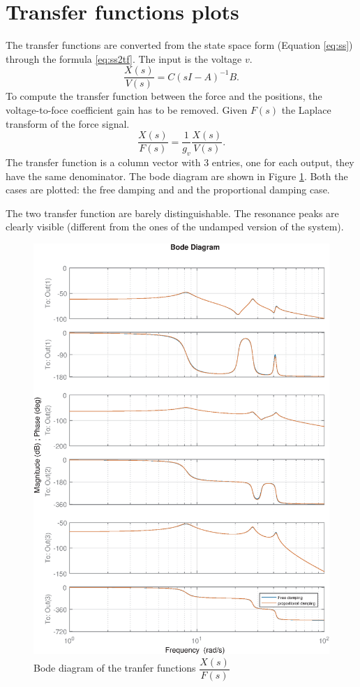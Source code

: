 \documentclass[twosided,a4paper]{article}           %
\begin{document}
\section{Transfer functions plots}
The transfer functions are converted from the state space form (Equation \eqref{eq:ss}) through the formula \eqref{eq:ss2tf}. The input is the voltage $v$.
\begin{equation}
\label{eq:ss2tf}
	\dfrac{X(s)}{V(s)} = C(sI-A)^{-1}B.
\end{equation}
To compute the transfer function between the force and the positions, the voltage-to-foce coefficient gain has to be removed. Given $F(s)$ the Laplace transform of the force signal.
\begin{equation}
	\dfrac{X(s)}{F(s)} = \dfrac{1}{g_v}\dfrac{X(s)}{V(s)}.
\end{equation}
The transfer function is a column vector with 3 entries, one for each output, they have the same denominator. The bode diagram are shown in Figure \ref{fig:bode_fp}. Both the cases are plotted: the free damping and and the proportional damping case. \\
\par \noindent
The two transfer function are barely distinguishable. The resonance peaks are clearly visible (different from the ones of the undamped version of the system).
\begin{figure}[H]
	\centering
	\includegraphics[width=\linewidth]{img/bode_fp}
	\caption{Bode diagram of the tranfer functions $\dfrac{X(s)}{F(s)}$}
	\label{fig:bode_fp}
\end{figure}
\end{document}
